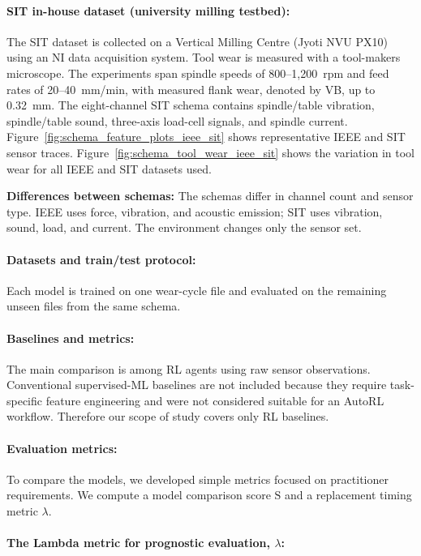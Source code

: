 \documentclass[sn-basic]{sn-jnl}%
\begin{document}
\paragraph{SIT in-house dataset (university milling testbed):}
The SIT dataset is collected on a Vertical Milling Centre (Jyoti NVU PX10) using an NI data acquisition system. Tool wear is measured with a tool-makers microscope. The experiments span spindle speeds of 800--1{,}200~rpm and feed rates of 20--40~mm/min, with measured flank wear, denoted by \textsc{VB}, up to 0.32~mm. The eight-channel SIT schema contains spindle/table vibration, spindle/table sound, three-axis load-cell signals, and spindle current. Figure~\ref{fig:schema_feature_plots_ieee_sit} shows representative IEEE and SIT sensor traces. Figure~\ref{fig:schema_tool_wear_ieee_sit} shows the variation in tool wear for all IEEE and SIT datasets used.

\textbf{Differences between schemas:}
The schemas differ in channel count and sensor type. IEEE uses force, vibration, and acoustic emission; SIT uses vibration, sound, load, and current. The environment changes only the sensor set.

\paragraph{Datasets and train/test protocol:}
Each model is trained on one wear-cycle file and evaluated on the remaining unseen files from the same schema. 

\paragraph{Baselines and metrics:}
\label{sec:metrics}
The main comparison is among RL agents using raw sensor observations. Conventional supervised-ML baselines are not included because they require task-specific feature engineering and were not considered suitable for an AutoRL workflow. Therefore our scope of study covers only RL baselines.

\paragraph{Evaluation metrics:}
To compare the models, we developed simple metrics focused on practitioner requirements. We compute a model comparison score $\mathrm{S}$ and a replacement timing metric $\lambda$.

\paragraph{The Lambda metric for prognostic evaluation, $\lambda$:}
\end{document}
